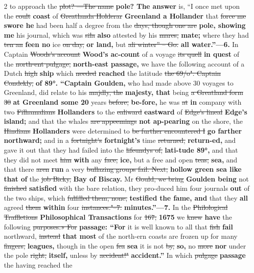 \documentclass[10pt]{article}
\begin{document}
\begin{multicols}{2}
to approach the \sout{plot? —The name} \textbf{pole? The answer} is, “I once met upon the \sout{coult} \textbf{coast} of \sout{Greatlanda Holderar} \textbf{Greenland a Hollander} that \sout{force me} \textbf{swore he} had been half a degree from the \sout{days, though one are} \textbf{pole, showing me} his journal, which was \sout{sila} \textbf{also} attested by his \sout{mares,} \textbf{mate;} where they had \sout{ten an} \textbf{feen no} ice \sout{on day,} \textbf{or land,} but \sout{ali winter” – Go.} \textbf{all water.”—6.} In Captain \sout{Woods’s account} \textbf{Wood's ac-count} of a voyage \sout{its quell} \textbf{in quest} of the \sout{north-ent pulgage,} \textbf{north-east passage,} we have the following account of a Dutch \sout{high} \textbf{ship} which \sout{needed} \textbf{reached} the latitude \sout{the 69/o". Captain Condekly,} \textbf{of 89°. “Captain Goulden,} who had made above 30 voyages to Greenland, did relate to his \sout{majdly, the} \textbf{majesty, that} being \sout{a Greatland form 30} \textbf{at Greenland some 20} years \sout{before,} \textbf{be-fore,} he was \sout{at} \textbf{in} company with two \sout{Filhamalians} \textbf{Hollanders} to the \sout{ealiward} \textbf{eastward} of \sout{Edge’s lineal} \textbf{Edge's island;} and that the whales \sout{are appeemings} \textbf{not ap-pearing} on the shore, the \sout{Hindians} \textbf{Hollanders} were determined to \sout{be further encountered I} \textbf{go farther northward;} and in a \sout{fortnight’s} \textbf{fortnight's} time \sout{returned,} \textbf{return-ed,} and gave it out that they had failed into the \sout{lifeundys of,} \textbf{lati-tude 89°,} and that they did not meet \sout{him} \textbf{with} any \sout{face,} \textbf{ice,} but a free and open \sout{teas,} \textbf{sea,} and that there \sout{aren} \textbf{run} a very \sout{bullazing groups fail. Next,} \textbf{hollow green sea like that of} the \sout{job Bicky,} \textbf{Bay of Biscay.} Mr \sout{Gould, we bring} \textbf{Goulden being} not \sout{finished} \textbf{satisfied} with the bare relation, they pro-duced him four journals \textbf{out} of the two ships, which \sout{fulfilled them, none,} \textbf{testified the fame, and} that they \textbf{all} agreed \sout{them} \textbf{within} four \sout{instances."--7.} \textbf{minutes.”—7.} In the \sout{Philological Traffletions} \textbf{Philosophical Transactions} for \sout{167;} \textbf{1675} we \sout{knew} \textbf{have} the following \sout{purposes.» For} \textbf{passage: “For} it is well known to all that \sout{fish} \textbf{fail} northward, \sout{instead} \textbf{that most} of the north-ern coasts are frozen up for many \sout{fingers,} \textbf{leagues,} though in the open \sout{fea} \textbf{sea} it is not \sout{by,} \textbf{so,} no \sout{more} \textbf{nor} under the pole \sout{right,} \textbf{itself,} unless by \sout{accident!"} \textbf{accident.”} In which \sout{pulgage} \textbf{passage} the having reached the
\end{multicols}
\end{document}
